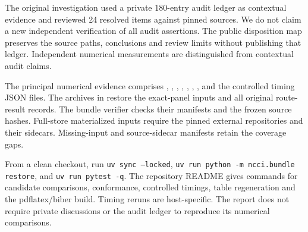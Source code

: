 The original investigation used a private 180-entry audit ledger as contextual evidence and reviewed 24 resolved items against pinned sources. We do not claim a new independent verification of all audit assertions. The public disposition map preserves the source paths, conclusions and review limits without publishing that ledger. Independent numerical measurements are distinguished from contextual audit claims.

The principal numerical evidence comprises , , , , , , , and the controlled timing JSON files. The archives in  restore the exact-panel inputs and all original route-result records. The bundle verifier checks their manifests and the frozen source hashes. Full-store materialized inputs require the pinned external repositories and their sidecars. Missing-input and source-sidecar manifests retain the coverage gaps.

From a clean checkout, run \texttt{uv sync --locked}, \texttt{uv run python -m ncci.bundle restore}, and \texttt{uv run pytest -q}. The repository README gives commands for candidate comparisons, conformance, controlled timings, table regeneration and the pdflatex/biber build. Timing reruns are host-specific. The report does not require private discussions or the audit ledger to reproduce its numerical comparisons.
